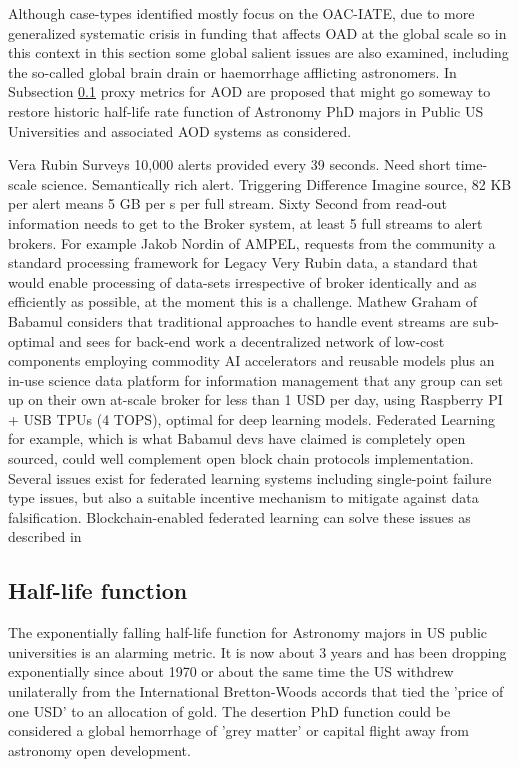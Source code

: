 \documentclass[final,5p,times,twocolumn,authoryear]{elsarticle}
\begin{document}
Although case-types identified mostly focus on  the OAC-IATE, due to more generalized systematic crisis in funding that affects OAD at the global scale so in this context in this section some global salient issues are also examined, including the so-called global brain drain or haemorrhage afflicting astronomers. In Subsection \ref{btc2:sec:sub:half} proxy metrics for AOD are proposed that might go someway to restore historic half-life rate function of Astronomy PhD majors in Public US Universities and associated AOD systems as considered. 

Vera Rubin Surveys 10,000 alerts provided every 39 seconds. Need short time-scale science. Semantically rich alert. Triggering Difference Imagine source, 82 KB per alert means 5 GB per s per full stream. Sixty Second from read-out information needs to get to the Broker system, at least 5 full streams to alert brokers.   For example  Jakob Nordin of AMPEL, requests from the community a standard processing framework for Legacy Very Rubin data, a standard that would enable processing of data-sets irrespective of broker identically and as efficiently as possible, at the moment this is a challenge.  Mathew Graham of Babamul considers that traditional approaches to handle event streams are sub-optimal and sees for back-end work a decentralized network of low-cost components employing commodity AI accelerators and reusable models plus an in-use science data platform for information management that any group can set up on their own at-scale broker for less than 1 USD per day, using Raspberry PI + USB TPUs (4 TOPS), optimal for deep learning models.  Federated Learning for example, which is what Babamul devs have claimed is completely open sourced, could well complement open block chain protocols implementation. Several issues exist for federated learning systems including single-point failure type issues, but also a suitable incentive mechanism to mitigate against data falsification. Blockchain-enabled federated learning can solve these issues as described in 


\subsection{Half-life function}
\label{btc2:sec:sub:half}

The exponentially falling half-life function for Astronomy majors in US public universities is an alarming metric. It is now about 3 years and has been dropping exponentially since about 1970 or about the same time the US withdrew unilaterally from the International Bretton-Woods accords that tied the 'price of one USD' to an allocation of gold. The desertion PhD function could be considered a global hemorrhage of 'grey matter' or capital flight away from astronomy open development.
\end{document}
